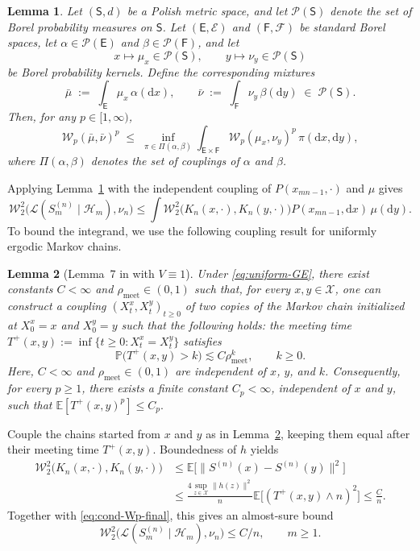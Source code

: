 \documentclass[11pt,letterpaper]{article}
\theoremstyle{plain}
\newtheorem{lemma}{Lemma}
\theoremstyle{definition}
\theoremstyle{remark}
\newcommand{\E}{\mathbb{E}}
\renewcommand{\P}{\mathbb{P}}
\newcommand{\W}{\mathcal{W}}
\begin{document}
\begin{lemma}\label{lem:mixture-Wp}
Let $(\mathsf S,d)$ be a Polish metric space, and let
$\mathcal P(\mathsf S)$ denote the set of Borel probability measures on
$\mathsf S$. Let $(\mathsf E,\mathcal E)$ and $(\mathsf F,\mathcal F)$ be
standard Borel spaces, let $\alpha\in\mathcal P(\mathsf E)$ and
$\beta\in\mathcal P(\mathsf F)$, and let
\[
x\mapsto \mu_x\in\mathcal P(\mathsf S),
\qquad
y\mapsto \nu_y\in\mathcal P(\mathsf S)
\]
be Borel probability kernels. Define the corresponding mixtures
\[
\bar\mu \;:=\; \int_{\mathsf E}\mu_x\,\alpha(\mathrm dx),
\qquad
\bar\nu \;:=\; \int_{\mathsf F}\nu_y\,\beta(\mathrm dy)
\;\in\; \mathcal P(\mathsf S).
\]
Then, for any $p\in[1,\infty)$,
\begin{equation}\label{eq:mixture-Wp}
\mathcal W_p(\bar\mu,\bar\nu)^p
\;\le\;
\inf_{\pi\in\Pi(\alpha,\beta)}
\int_{\mathsf E\times\mathsf F}
\mathcal W_p(\mu_x,\nu_y)^p\,\pi(\mathrm dx,\mathrm dy),
\end{equation}
where $\Pi(\alpha,\beta)$ denotes the set of couplings of $\alpha$ and $\beta$.
\end{lemma}
Applying Lemma~\ref{lem:mixture-Wp} with the independent coupling of
\(P(x_{mn-1},\cdot)\) and \(\mu\) gives
\begin{equation}\label{eq:cond-Wp-final}
    \W_2^2\bigl(\mathcal L(S_m^{(n)}\mid\mathcal H_m),\nu_n\bigr)
    \leq
    \int\W_2^2\bigl(K_n(x,\cdot),K_n(y,\cdot)\bigr)
        P(x_{mn-1},\mathrm dx)\,\mu(\mathrm dy).
\end{equation}
To bound the integrand, we use the following coupling result for uniformly
ergodic Markov chains.

\begin{lemma}[Lemma~7 in \cite{zhang2026wasserstein} with $V\equiv1$]
\label{lem:forward-meeting}
Under \eqref{eq:uniform-GE}, there exist constants
$C<\infty$ and $\rho_{\mathrm{meet}}\in(0,1)$ such that, for every
$x,y\in\mathcal X$, one can construct a coupling
$(X_t^x,X_t^y)_{t\geq0}$ of two copies of the Markov chain initialized at
$X_0^x=x$ and $X_0^y=y$ such that the following holds: the meeting time $T^+(x,y):=\inf\{t\ge0: X_t^x=X_t^y\}$ satisfies%
\[
  \P\bigl(T^+(x,y)>k\bigr)
  \lesssim
C\rho_{\mathrm{meet}}^k,
  \qquad k\ge0.
\]
Here, $C<\infty$ and $\rho_{\mathrm{meet}} \in (0,1)$ are independent of $x$, $y$, and $k$.
Consequently, for every $p\geq1$, there exists a finite constant
$C_p<\infty$, independent of $x$ and $y$, such that $\E\!\left[T^+(x,y)^p\right]
    \leq C_p.$
\end{lemma}
Couple the chains started from \(x\) and \(y\) as in
Lemma~\ref{lem:forward-meeting}, keeping them equal after their meeting
time \(T^+(x,y)\). Boundedness of \(h\) yields
\begin{align}
    \W_2^2\bigl(K_n(x,\cdot),K_n(y,\cdot)\bigr)
    &\leq\E\bigl[\|S^{(n)}(x)-S^{(n)}(y)\|^2\bigr]\nonumber\\
    &\leq\frac{4\sup_{z\in\mathcal X}\|h(z)\|^2}{n}
        \E\bigl[(T^+(x,y)\wedge n)^2\bigr]
    \leq\frac{C}{n}.
    \label{eq:cond-Wp-final1}
\end{align}
Together with \eqref{eq:cond-Wp-final}, this gives an almost-sure bound
\[
    \W_2^2\bigl(\mathcal L(S_m^{(n)}\mid\mathcal H_m),\nu_n\bigr)
    \leq C/n,
    \qquad m\geq1.
\]
\end{document}
